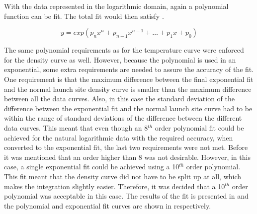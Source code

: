 With the data represented in the logarithmic domain, again a polynomial function can be fit. The total fit would then satisfy .

\begin{equation} \label{eq:expPoly}
y=exp\left( p_{n}x^{n}+p_{n-1}x^{n-1}+\dots+p_{1}x+p_{0}\right)
\end{equation}



%

The same polynomial requirements as for the temperature curve were enforced for the density curve as well. However, because the polynomial is used in an exponential, some extra requirements are needed to assure the accuracy of the fit. One requirement is that the maximum difference between the final exponential fit and the normal launch site density curve is smaller than the maximum difference between all the data curves. Also, in this case the standard deviation of the difference between the exponential fit and the normal launch site curve had to be within the range of standard deviations of the difference between the different data curves. This meant that even though an 8$^{th}$ order polynomial fit could be achieved for the natural logarithmic data with the required accuracy, when converted to the exponential fit, the last two requirements were not met. Before it was mentioned that an order higher than 8 was not desirable. However, in this case, a single exponential fit could be achieved using a 10$^{th}$ order polynomial. This fit meant that the density curve did not have to be split up at all, which makes the integration slightly easier. Therefore, it was decided that a 10$^{th}$ order polynomial was acceptable in this case. The results of the fit is presented in  and the polynomial and exponential fit curves are shown in  respectively.

%

